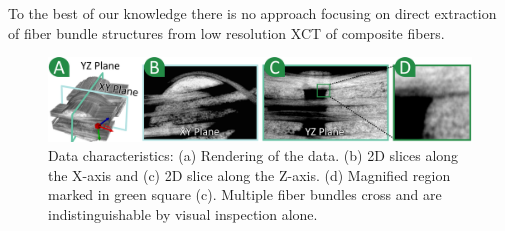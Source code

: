 To the best of our knowledge there is no approach focusing on direct extraction of fiber bundle structures from low resolution XCT of composite fibers.



\begin{figure}[tb]
\centering
\includegraphics[width=\linewidth]{images_pvis/data-char.pdf}
\caption{Data characteristics: (a) Rendering of the data. (b) 2D slices along the X-axis and (c) 2D slice along the Z-axis. (d) Magnified region marked in green square (c). Multiple fiber bundles cross and are indistinguishable by visual inspection alone. }
\label{fig:data-char}
\end{figure}
